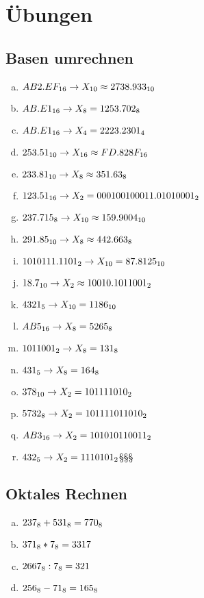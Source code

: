 \documentclass[12pt, a4paper, oneside]{article}
\begin{document}
\newpage
\section{Übungen}
\subsection{Basen umrechnen}
\begin{enumerate}[a.)]
  \item $AB2.EF_{16} \rightarrow X_{10} \hfill \approx 2738.933_{10}$
  \item $AB.E1_{16} \rightarrow X_{8} \hfill = 1253.702_{8}$ 
  \item $AB.E1_{16} \rightarrow X_{4} \hfill = 2223.2301_{4}$
  \item $253.51_{10} \rightarrow X_{16} \hfill \approx FD.828F_{16}$
  \item $233.81_{10} \rightarrow X_{8} \hfill \approx 351.63_{8}$
  \item $123.51_{16} \rightarrow X_{2} \hfill = 0001 0010 0011.0101 0001_{2}$
  \item $237.715_{8} \rightarrow X_{10} \hfill \approx 159.9004_{10}$
  \item $291.85_{10} \rightarrow X_{8} \hfill \approx 442.663_{8}$
  \item $101 0111.1101_{2} \rightarrow X_{10} \hfill = 87.8125_{10}$
  \item $18.7_{10} \rightarrow X_{2} \hfill \approx 1 0010.1011001_{2}$
  \item $4321_{5} \rightarrow X_{10} \hfill = 1186_{10}$
  \item $AB5_{16} \rightarrow X_{8} \hfill = 5265_{8}$
  \item $1011001_{2} \rightarrow X_{8} \hfill = 131_{8}$
  \item $431_{5} \rightarrow X_{8} \hfill = 164_{8}$
  \item $378_{10} \rightarrow X_{2} \hfill = 101111010_{2}$
  \item $5732_{8} \rightarrow X_{2} \hfill = 101111011010_{2}$
  \item $AB3_{16} \rightarrow X_{2} \hfill = 101010110011_{2}$
  \item $432_{5} \rightarrow X_{2} \hfill = 1110101_{2}$§§§
\end{enumerate}

\subsection{Oktales Rechnen}
\begin{enumerate}[a.)]
  \item $237_{8} + 531_{8} \hfill = 770_{8}$
  \item $371_{8} * 7_{8} \hfill = 3317$
  \item $2667_{8} : 7_{8} \hfill = 321$
  \item $256_{8} - 71_{8} \hfill = 165_{8}$
\end{enumerate}
\end{document}
